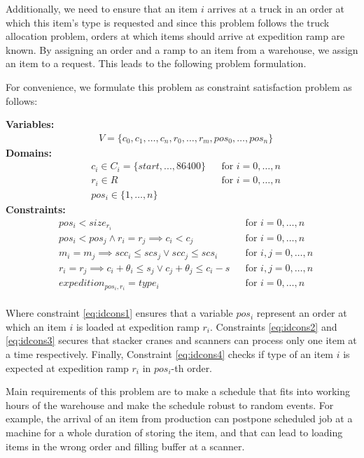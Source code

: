 \documentclass{ctuthesis}
\begin{document}
Additionally, we need to ensure that an item $i$ arrives at a truck in an order at which this item's type is requested and since this problem follows the truck allocation problem, orders at which items should arrive at expedition ramp are known. By assigning an order and a ramp to an item from a warehouse, we assign an item to a request. This leads to the following problem formulation.

For convenience, we formulate this problem as constraint satisfaction problem as follows:

\textbf{Variables:}
\begin{align}
    &V = \{c_{0}, c_{1}, \ldots, c_{n},r_0, \ldots, r_m, pos_0, \ldots, pos_n\}
\end{align}
\textbf{Domains:}
\begin{align}
&c_{i} \in C_i = \{start, ..., 86400\} && \text{for } i=0,\ldots,n\\
&r_{i} \in R && \text{for } i=0,\ldots,n\\
&pos_i \in \{1, \ldots, n\}
\end{align}
\textbf{Constraints:}
 \begin{align}
& pos_i < size_{r_i} && \text{for } i=0,\ldots,n \nonumber \\
& pos_i < pos_j \land r_i = r_j \implies c_i < c_j && \text{for } i=0,\ldots,n\\ \label{eq:idcons1}
& m_i = m_j \implies scc_i \leq scs_j \lor scc_j \leq scs_i && \text{for } i,j=0,\ldots,n\\ \label{eq:idcons2}
& r_i = r_j \implies c_i  + \theta_i \leq s_j \lor c_j + \theta_j \leq c_i - s && \text{for } i,j=0,\ldots,n\\ \label{eq:idcons3}
& expedition_{pos_i,r_i} = type_i  && \text{for } i=0,\ldots,n\\ \label{eq:idcons4}
\end{align}

Where constraint \ref{eq:idcons1} ensures that a variable $pos_i$ represent an order at which an item $i$ is loaded at expedition ramp $r_i$. Constraints \ref{eq:idcons2} and \ref{eq:idcons3} secures that stacker cranes and scanners can process only one item at a time respectively. Finally, Constraint \ref{eq:idcons4} checks if type of an item $i$ is expected at expedition ramp $r_i$ in $pos_i$-th order.

Main requirements of this problem are to make a schedule that fits into working hours of the warehouse and make the schedule robust to random events. For example, the arrival of an item from production can postpone scheduled job at a machine for a whole duration of storing the item, and that can lead to loading items in the wrong order and filling buffer at a scanner. 
\end{document}
